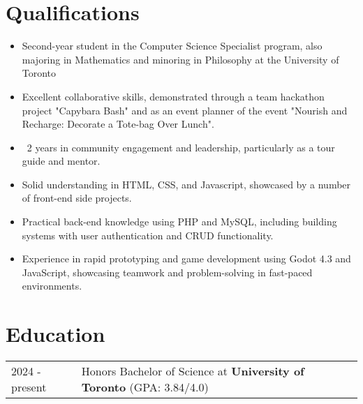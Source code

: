 \documentclass[a4paper,10pt]{article} %
\makeatletter
\newenvironment{joblong}[2]
    {
    \begin{tabularx}{\linewidth}{@{}l X r@{}}
    \textbf{#1} & \hfill &  #2 \\[3.75pt]
    \end{tabularx}
    \begin{minipage}[t]{\linewidth}
    \begin{itemize}[nosep,after=\strut, leftmargin=1em, itemsep=3pt,label=--]
    }
    {
    \end{itemize}
    \end{minipage}    
    }
\makeatother
\begin{document}

\section{Qualifications}
\begin{itemize}
    \item Second-year student in the Computer Science Specialist program, also majoring in Mathematics and minoring in Philosophy at the University of Toronto
    \item Excellent collaborative skills, demonstrated through a team hackathon project "Capybara Bash" and as an event planner of the event "Nourish and Recharge: Decorate a Tote-bag Over Lunch".
    \item ~2 years in community engagement and leadership, particularly as a tour guide and mentor.
    \item Solid understanding in HTML, CSS, and Javascript, showcased by a number of front-end side projects.
    \item Practical back-end knowledge using PHP and MySQL, including building systems with user authentication and CRUD functionality.
    \item Experience in rapid prototyping and game development using Godot 4.3 and JavaScript, showcasing teamwork and problem-solving in fast-paced environments.
\end{itemize}

\section{Education}
\begin{tabularx}{\linewidth}{@{}l X@{}}
    2024 - present & Honors Bachelor of Science at \textbf{University of Toronto} \hfill \normalsize (GPA: 3.84/4.0) \\
\end{tabularx}
\end{document}
